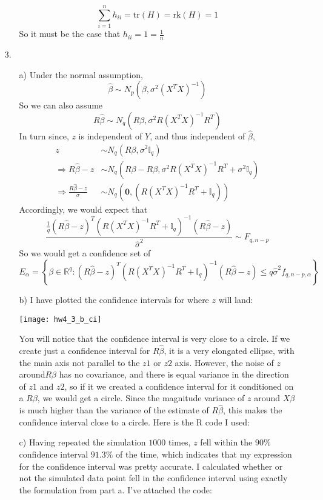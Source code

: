 \documentclass[11pt]{article}
\newcommand{\R}{\mathbb{R}}
\theoremstyle{definition}
\begin{document}
\begin{itemize}
\begin{itemize}
                \[\sum_{i=1}^n h_{ii} = \mathrm{tr}(H) = \mathrm{rk}(H) = 1 \]
                So it must be the case that $h_{ii}=1=\frac{1}{n}$
        \end{itemize}
    \item[3.]
        \begin{itemize}
            \item[a)]
                Under the normal assumption,
                \[ \hat\beta \sim N_p(\beta,\sigma^2(X^TX)^{-1}) \]
                So we can also assume 
                \[ R\hat\beta \sim N_q(R\beta,\sigma^2R(X^TX)^{-1}R^T) \]
                In turn since, $z$ is independent of $Y$, and thus independent of $\hat\beta$, 
                \begin{align*}
                     z &\sim N_q(R\beta, \sigma^2 \mathbb{I}_q) \\
                    \Rightarrow  R\hat\beta - z &\sim N_q(R\beta - R\beta,\sigma^2R(X^TX)^{-1}R^T+\sigma^2 \mathbb{I}_q) \\
                    \Rightarrow  \frac{R\hat\beta - z}{\sigma} &\sim N_q(\mathbf{0},(R(X^TX)^{-1}R^T+\mathbb{I}_q))
                \end{align*}
                Accordingly, we would expect that 
                \[\frac{\frac{1}{q}(R\hat\beta - z)^T(R(X^TX)^{-1}R^T+\mathbb{I}_q)^{-1}(R\hat\beta - z)}{\hat\sigma^2} \sim F_{q,n-p} \]
                So we would get a confidence set of 
                \[ E_\alpha = \left\{\beta\in \R^q : (R\hat\beta - z)^T(R(X^TX)^{-1}R^T+\mathbb{I}_q)^{-1}(R\hat\beta - z) \leq q\hat\sigma^2 f_{q,n-p,\alpha} \right\} \]
            \item[b)]
                I have plotted the confidence intervals for where $z$ will land:
                \begin{center}
                    \texttt{[image: hw4\_3\_b\_ci]} 
                \end{center}
                You will notice that the confidence interval is very close to a circle. If we create just a confidence interval for \(R\hat\beta\), it is a very elongated ellipse, with the main axis not parallel to the $z1$ or $z2$ axis. However, the noise of $z$ around$R\beta$ has no covariance, and there is equal variance in the direction of $z1$ and $z2$, so if it we created a confidence interval for it conditioned on a $R\beta$, we would get a circle. Since the magnitude variance of $z$ around $X\beta$ is much higher than the variance of the estimate of $R\hat\beta$, this makes the confidence interval close to a circle.
                Here is the R code I used:
                
            \item[c)]
                Having repeated the simulation $1000$ times, $z$ fell within the $90\%$ confidence interval $91.3\%$ of the time, which indicates that my expression for the confidence interval was pretty accurate. I calculated whether or not the simulated data point fell in the confidence interval using exactly the formulation from part a. I've attached the code:


\end{itemize}
\end{itemize}
\end{document}
